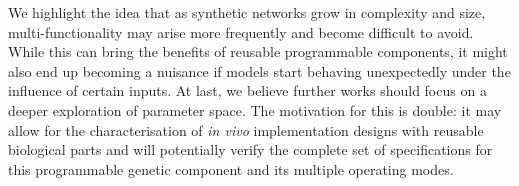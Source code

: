   We highlight the idea that as synthetic networks grow in complexity and size, multi-functionality may arise more frequently and become difficult to avoid.
  While this can bring the benefits of reusable programmable components, it might also end up becoming a nuisance if models start behaving unexpectedly under the influence of certain inputs.
  At last, we believe further works should focus on a deeper exploration of parameter space.
  The motivation for this is double: it may allow for the characterisation of \textit{in vivo} implementation designs with reusable biological parts and will potentially verify the complete set of specifications for this programmable genetic component and its multiple operating modes.
